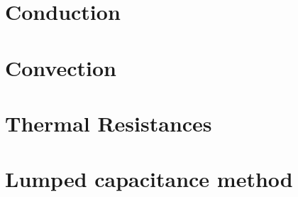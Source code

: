 \documentclass[numerate]{cheatsheet}
\author{Christian Leser (cleser@ethz.ch) \\ \vspace*{-0.2em}}
\begin{document}
\section{Conduction}
	
	

\section{Convection}
	

\section{Thermal Resistances}
	

\section{Lumped capacitance method}
	

\end{document}
